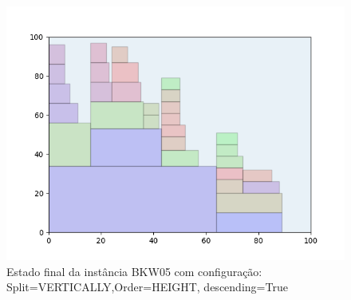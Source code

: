 \begin{figure}[H]
    \centering
    \caption[]{Estado final da instância BKW05 com configuração: Split=VERTICALLY,Order=HEIGHT, descending=True}
    \label{fig:bkw05-vertically-height-true}
    \includegraphics[scale=0.5]{output/figures/bkw/bkw05/vertically/height/true/00}
\end{figure}